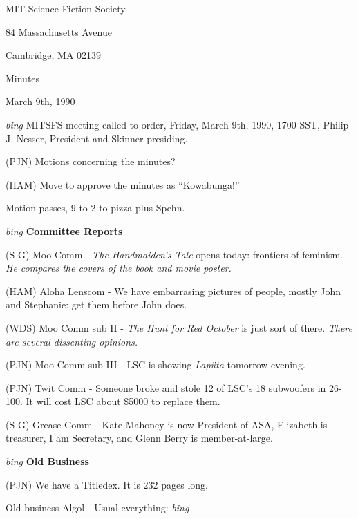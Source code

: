 \setlength{\topmargin}{-0.5in}
\setlength{\oddsidemargin}{0.0in}
\setlength{\evensidemargin}{0.0in}
\setlength{\textheight}{9in}
\setlength{\textwidth}{6.5in}



\begin{center}
MIT Science Fiction Society

84 Massachusetts Avenue

Cambridge, MA 02139

\vspace{0.2in}
Minutes

March 9th, 1990

\end{center}
 
\vspace{0.15in}
{\em bing\/}  MITSFS meeting called to order, Friday, March 9th, 1990,
1700 SST, Philip J. Nesser, President and Skinner presiding.

(PJN) Motions concerning the minutes?

(HAM) Move to approve the minutes as ``Kowabunga!''

Motion passes, 9 to 2 to pizza plus Spehn.

\vspace{0.15in}
{\em bing\/} {\bf Committee Reports}

(S G) Moo Comm - {\em The Handmaiden's Tale} opens today: frontiers of
feminism.  {\em He compares the covers of the book and movie poster.}

(HAM) Aloha Lenscom - We have embarrasing pictures of people, mostly
John and Stephanie: get them before John does.

(WDS) Moo Comm sub II - {\em The Hunt for Red October} is just sort of
there.  {\em There are several dissenting opinions.}

(PJN) Moo Comm sub III - LSC is showing {\em Lap\"{u}ta} tomorrow
evening.

(PJN) Twit Comm - Someone broke and stole 12 of LSC's 18 subwoofers in
26-100.  It will cost LSC about \$5000 to replace them.

(S G) Grease Comm - Kate Mahoney is now President of ASA, Elizabeth is
treasurer, I am Secretary, and Glenn Berry is member-at-large.

\vspace{0.15in}
{\em bing\/} {\bf Old Business}

(PJN) We have a Titledex.  It is 232 pages long.

Old business Algol - Usual everything: {\em bing\/}

